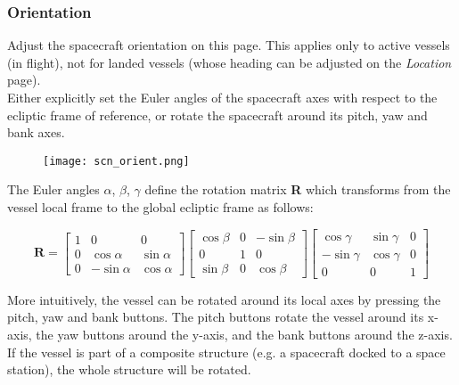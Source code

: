 \documentclass[Orbiter User Manual.tex]{subfiles}
\begin{document}
\subsubsection{Orientation}
Adjust the spacecraft orientation on this page. This applies only to active vessels (in flight), not for landed vessels (whose heading can be adjusted on the \textit{Location} page).\\
Either explicitly set the Euler angles of the spacecraft axes with respect to the ecliptic frame of reference, or rotate the spacecraft around its pitch, yaw and bank axes.

\begin{figure}[H]
	\centering
	\texttt{[image: scn\_orient.png]}
\end{figure}

\noindent
The Euler angles $\alpha$, $\beta$, $\gamma$ define the rotation matrix \textbf{R} which transforms from the vessel local frame to the global ecliptic frame as follows:

\[ \mathbf{R} = 
\begin{bmatrix}
1 & 0 & 0\\
0 & \cos \alpha & \sin \alpha\\
0 & -\sin \alpha & \cos \alpha
\end{bmatrix}
\begin{bmatrix}
\cos \beta & 0 & -\sin \beta\\
0 & 1 & 0\\
\sin \beta & 0 & \cos \beta
\end{bmatrix}
\begin{bmatrix}
\cos \gamma & \sin \gamma & 0\\
-\sin \gamma & \cos \gamma & 0\\
0 & 0 & 1
\end{bmatrix}
\]

\noindent
More intuitively, the vessel can be rotated around its local axes by pressing the pitch, yaw and bank buttons. The pitch buttons rotate the vessel around its x-axis, the yaw buttons around the y-axis, and the bank buttons around the z-axis.\\
If the vessel is part of a composite structure (e.g. a spacecraft docked to a space station), the whole structure will be rotated.
\end{document}
